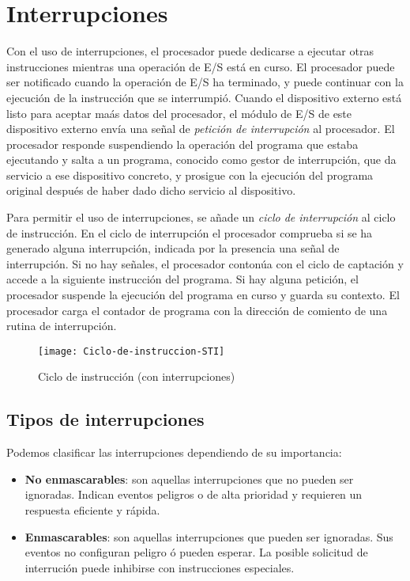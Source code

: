 \section{Interrupciones}

Con el uso de interrupciones, el procesador puede dedicarse a ejecutar otras instrucciones mientras una operación de E/S está en curso. El procesador puede ser notificado cuando la operación de E/S ha terminado, y puede continuar con la ejecución de la instrucción que se interrumpió.
Cuando el dispositivo externo está listo para aceptar maás datos del procesador, el módulo de E/S de este dispositivo externo envía una señal de \textit{petición de interrupción} al procesador. El procesador responde suspendiendo la operación del programa que estaba ejecutando y salta a un programa, conocido como gestor de interrupción, que da servicio a ese dispositivo concreto, y prosigue con la ejecución del programa original después de haber dado dicho servicio al dispositivo.

Para permitir el uso de interrupciones, se añade un \textit{ciclo de interrupción} al ciclo de instrucción. En el ciclo de interrupción el procesador comprueba si se ha generado alguna interrupción, indicada por la presencia una señal de interrupción. Si no hay señales, el procesador contonúa con el ciclo de captación y accede a la siguiente instrucción del programa. Si hay alguna petición, el procesador suspende la ejecución del programa en curso y guarda su contexto. El procesador carga el contador de programa con la dirección de comiento de una rutina de interrupción.

\begin{figure}[h]
  \centering
  \texttt{[image: Ciclo-de-instruccion-STI]}
  \caption{Ciclo de instrucción (con interrupciones)}
\end{figure}

\subsection{Tipos de interrupciones}

Podemos clasificar las interrupciones dependiendo de su importancia:

\begin{itemize}
  \item \textbf{No enmascarables}: son aquellas interrupciones que no pueden ser ignoradas. Indican eventos peligros o de alta prioridad y requieren un respuesta eficiente y rápida.
  \item \textbf{Enmascarables}: son aquellas interrupciones que pueden ser ignoradas. Sus eventos no configuran peligro ó pueden esperar. La posible solicitud de interrución puede inhibirse con instrucciones especiales.
\end{itemize}

